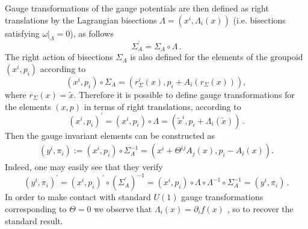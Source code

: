 \documentclass[12pt,a4paper]{article}
\numberwithin{equation}{section}
\theoremstyle{definition}
\begin{document}
Gauge transformations of the gauge potentials  are then defined as  right translations  by the {Lagrangian bisections} $\Lambda=(x^i,\Lambda_i(x))$ (i.e. bisections  satisfying $\left.\omega\right|_\Lambda=0$), as follows
\begin{equation}
\Sigma^\prime_A=\Sigma_A\circ\Lambda\,.
\end{equation}
The right action of bisections $\Sigma_A$ is also defined for the elements of the groupoid $(x^i,p_i)$ according to
\begin{equation}
(x^i,p_i)\circ \Sigma_A=\left(r_{\Sigma}^i(x),p_i+A_i(r_{\Sigma}(x))\right),
\end{equation}
where $r_{\Sigma}(x)=\tilde{x}$.
Therefore it is possible to define gauge transformations 
for the elements $(x,p)$ in terms of  right translations, according to
\begin{equation}
(x^i,p_i)^\prime=(x^i,p_i)\circ\Lambda = (\tilde{x}^i, p_i+\Lambda_i(\tilde{x}))\,.
\end{equation}
Then the gauge invariant elements can be constructed as
\begin{eqnarray}\label{gicmc}
(y^i,\pi_i):=(x^i,p_i)\circ \Sigma^{-1}_A = \left(x^i+\Theta^{ij}A_j(x),p_i-A_i(x)\right).
\end{eqnarray}
Indeed, one may easily see that they verify
\begin{equation}\label{coordtransf}
(y^i,\pi_i)^{\prime}=(x^i,p_i)^\prime \circ \left(\Sigma^\prime_A\right)^{-1}=(x^i,p_i) \circ \Lambda \circ \Lambda^{-1} \circ \Sigma^{-1}_A = (y^i, \pi_i)\,.
\end{equation}
{In order to make contact with standard $U(1)$ gauge transformations corresponding to $\Theta=0$ we observe that  $\Lambda_i(x)=\partial_if(x)$ \cite{Kupriyanov:2023qot}, so to  recover the standard result.}
\end{document}
